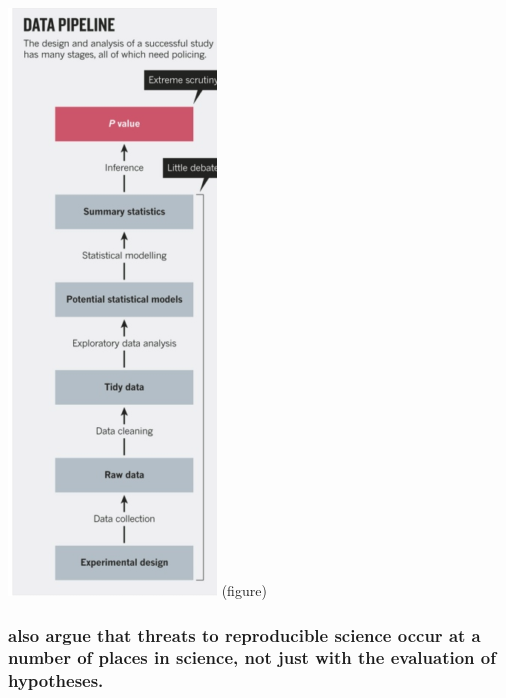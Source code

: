 \documentclass[
  openany]{book}
\begin{document}
\includegraphics{leek2015pipeline.PNG} (figure)

\hypertarget{munafo2017manifesto-also-argue-that-threats-to-reproducible-science-occur-at-a-number-of-places-in-science-not-just-with-the-evaluation-of-hypotheses.}{%
\subsubsection{\texorpdfstring{\citet{munafo2017manifesto} also argue that threats to reproducible science occur at a number of places in science, not just with the evaluation of hypotheses.}{@munafo2017manifesto also argue that threats to reproducible science occur at a number of places in science, not just with the evaluation of hypotheses.}}\label{munafo2017manifesto-also-argue-that-threats-to-reproducible-science-occur-at-a-number-of-places-in-science-not-just-with-the-evaluation-of-hypotheses.}}
\end{document}
